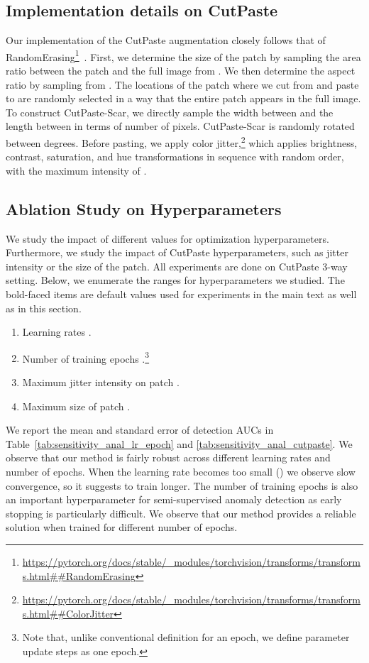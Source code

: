 \documentclass[final]{cvpr}
\begin{document}
\subsection{Implementation details on CutPaste}
\label{sec:exp_cutpaste}
Our implementation of the CutPaste augmentation closely follows that of RandomErasing\footnote{\url{https://pytorch.org/docs/stable/_modules/torchvision/transforms/transforms.html##RandomErasing}}~\cite{zhong2020random}.
First, we determine the size of the patch by sampling the area ratio between the patch and the full image from . We then determine the aspect ratio by sampling from . The locations of the patch where we cut from and paste to are randomly selected in a way that the entire patch appears in the full image.
To construct CutPaste-Scar, we directly sample the width between  and the length between  in terms of number of pixels. 
CutPaste-Scar is randomly rotated between  degrees. Before pasting, we apply color jitter,\footnote{\url{https://pytorch.org/docs/stable/_modules/torchvision/transforms/transforms.html##ColorJitter}} which applies brightness, contrast, saturation, and hue transformations in sequence with random order, with the maximum intensity of .

\subsection{Ablation Study on Hyperparameters}
\label{sec:exp_hparams}

We study the impact of different values for optimization hyperparameters. Furthermore, we study the impact of CutPaste hyperparameters, such as jitter intensity or the size of the patch. All experiments are done on CutPaste 3-way setting. Below, we enumerate the ranges for hyperparameters we studied. The bold-faced items are default values used for experiments in the main text as well as in this section. 

\begin{enumerate}
    \setlength\itemsep{0em}
    \item Learning rates .
    \item Number of training epochs .\footnote{Note that, unlike conventional definition for an epoch, we define  parameter update steps as one epoch.}
    \item Maximum jitter intensity on patch .
    \item Maximum size of patch .
\end{enumerate}

We report the mean and standard error of detection AUCs in Table~\ref{tab:sensitivity_anal_lr_epoch} and \ref{tab:sensitivity_anal_cutpaste}. We observe that our method is fairly robust across different learning rates and number of epochs. When the learning rate becomes too small () we observe slow convergence, so it suggests to train longer. The number of training epochs is also an important hyperparameter for semi-supervised anomaly detection as early stopping is particularly difficult. We observe that our method provides a reliable solution when trained for different number of epochs.
\end{document}
